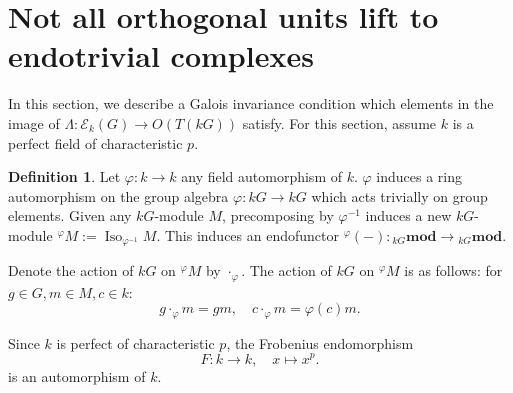 \documentclass[10pt,letterpaper, boxed, cm]{amsart}
\newcommand{\inv}{^{-1}}
\newcommand{\Iso}{\operatorname{Iso}}
\newcommand{\calE}{\mathcal{E}}
\theoremstyle{remark}
\theoremstyle{definition}
\newtheorem{definition}[theorem]{Definition}
\begin{document}
	\section{Not all orthogonal units lift to endotrivial complexes}\label{nonsurjectivesection}

	In this section, we describe a Galois invariance condition which elements in the image of $\Lambda: \calE_k(G) \to O(T(kG))$ satisfy. For this section, assume $k$ is a perfect field of characteristic $p$.

	\begin{definition}
		Let $\varphi: k\to k$ any field automorphism of $k$. $\varphi$ induces a ring automorphism on the group algebra $\varphi: kG\to kG$ which acts trivially on group elements. Given any $kG$-module $M$, precomposing by $\varphi\inv$ induces a new $kG$-module $^{\varphi}M:= \Iso_{\varphi\inv} M$. This induces an endofunctor $^\varphi(-): {}_{kG}\mathbf{mod} \to {}_{kG}\mathbf{mod}$.

		Denote the action of $kG$ on ${}^\varphi M$ by $\cdot_\varphi$. The action of $kG$ on  $^{\varphi}M$ is as follows: for $g \in G, m \in M, c \in k$:
		\[g\cdot_\varphi m = g m, \quad c\cdot_\varphi m = \varphi(c)m.\]

		Since $k$ is perfect of characteristic $p$, the Frobenius endomorphism \[F: k \to k,\quad x \mapsto x^p.\] is an automorphism of $k$.
	\end{definition}
\end{document}
